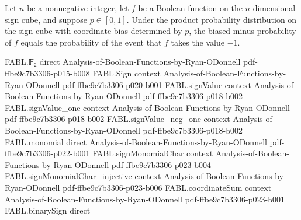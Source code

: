 \begin{theorem}
\label{FABL.biasedMinusProbability_eq_measureReal}
\leanok
{}
Let $n$ be a nonnegative integer, let $f$ be a Boolean function on the $n$-dimensional
sign cube, and suppose $p\in[0,1]$. Under the product probability distribution on the
sign cube with coordinate bias determined by $p$, the biased-minus probability of $f$
equals the probability of the event that $f$ takes the value $-1$.
\end{theorem}

\begin{theorem}
\label{FABL.one_sub_two_mul_exp_le_biasedMinusProbability_majority_upper}
\leanok
{}
\proofstep
  {FABL.𝔽₂}
  {direct}
  {Analysis-of-Boolean-Functions-by-Ryan-ODonnell}
  {pdf-ffbe9c7b3306-p015-b008}
\proofstep
  {FABL.Sign}
  {context}
  {Analysis-of-Boolean-Functions-by-Ryan-ODonnell}
  {pdf-ffbe9c7b3306-p020-b001}
\proofstep
  {FABL.signValue}
  {context}
  {Analysis-of-Boolean-Functions-by-Ryan-ODonnell}
  {pdf-ffbe9c7b3306-p018-b002}
\proofstep
  {FABL.signValue_one}
  {context}
  {Analysis-of-Boolean-Functions-by-Ryan-ODonnell}
  {pdf-ffbe9c7b3306-p018-b002}
\proofstep
  {FABL.signValue_neg_one}
  {context}
  {Analysis-of-Boolean-Functions-by-Ryan-ODonnell}
  {pdf-ffbe9c7b3306-p018-b002}
\proofstep
  {FABL.monomial}
  {direct}
  {Analysis-of-Boolean-Functions-by-Ryan-ODonnell}
  {pdf-ffbe9c7b3306-p022-b001}
\proofstep
  {FABL.signMonomialChar}
  {context}
  {Analysis-of-Boolean-Functions-by-Ryan-ODonnell}
  {pdf-ffbe9c7b3306-p023-b004}
\proofstep
  {FABL.signMonomialChar_injective}
  {context}
  {Analysis-of-Boolean-Functions-by-Ryan-ODonnell}
  {pdf-ffbe9c7b3306-p023-b006}
\proofstep
  {FABL.coordinateSum}
  {context}
  {Analysis-of-Boolean-Functions-by-Ryan-ODonnell}
  {pdf-ffbe9c7b3306-p023-b001}
\proofstep
  {FABL.binarySign}
  {direct}

\end{theorem}
